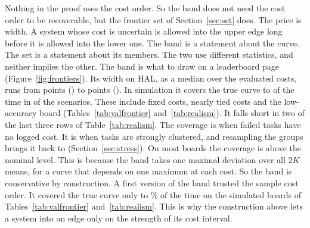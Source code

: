 \documentclass[11pt]{article}
\begin{document}
Nothing in the proof uses the cost order. So the band does not need the cost order to be recoverable, but the frontier set of Section~\ref{sec:set} does. The price is width. A system whose cost is uncertain is allowed into the upper edge long before it is allowed into the lower one. The band is a statement about the curve. The set is a statement about its members. The two use different statistics, and neither implies the other. The band is what to draw on a leaderboard page (Figure~\ref{fig:frontiers}). Its width on HAL, as a median over the evaluated costs, runs from \NumHalBandWidthMin{} points (\NumHalBandWidthMinName) to \NumHalBandWidthMax{} points (\NumHalBandWidthMaxName). In simulation it covers the true curve \NumValBandCovMin{} to \NumValBandCovMax{} of the time in \NumValScenariosFirst{} of the \NumValScenarios{} scenarios. These include fixed costs, nearly tied costs and the low-accuracy board (Tables~\ref{tab:valfrontier} and~\ref{tab:realism}). It falls short in two of the last three rows of Table~\ref{tab:realism}. The coverage is \NumValScMissingCostLogsBand{} when failed tasks have no logged cost. It is \NumValScStronglyClusteredTasksBand{} when tasks are strongly clustered, and resampling the groups brings it back to \NumValScStronglyClusteredTasksBandCluster{} (Section~\ref{sec:stress}). On most boards the coverage is above the nominal level. This is because the band takes one maximal deviation over all $2K$ means, for a curve that depends on one maximum at each cost. So the band is conservative by construction. A first version of the band trusted the sample cost order. It covered the true curve only \NumValBandNaiveCovMin{} to \NumValBandNaiveCovMax\% of the time on the simulated boards of Tables~\ref{tab:valfrontier} and~\ref{tab:realism}. This is why the construction above lets a system into an edge only on the strength of its cost interval.
\end{document}
